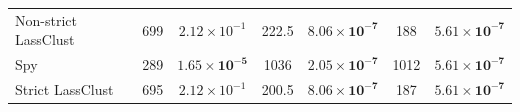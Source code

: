 \documentclass[11pt]{article}
\begin{document}
\begin{table}[H]
\begin{tabular}{lcccccc}
Non-strict LassClust 

& 699 & $2.12\times10^{-1}$ 

& 222.5 & $\mathbf{8.06\times10^{-7}}$ 

& 188 & $\mathbf{5.61\times10^{-7}}$ \\ 

 

Spy 

& 289 & $\mathbf{1.65\times10^{-5}}$ 

& 1036 & $\mathbf{2.05\times10^{-7}}$ 

& 1012 & $\mathbf{5.61\times10^{-7}}$ \\ 

 

Strict LassClust 

& 695 & $2.12\times10^{-1}$ 

& 200.5 & $\mathbf{8.06\times10^{-7}}$ 

& 187 & $\mathbf{5.61\times10^{-7}}$ \\ 

\bottomrule 

\end{tabular} 

\end{table} 
\end{document}
